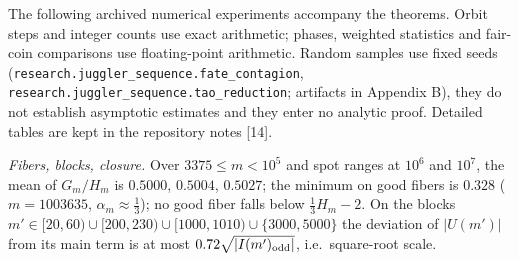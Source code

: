 \documentclass[11pt,a4paper]{article}
\begin{document}
The following archived numerical experiments accompany the theorems.
Orbit steps and integer counts use exact arithmetic; phases, weighted
statistics and fair-coin comparisons use floating-point arithmetic.
Random samples use fixed seeds
(\texttt{\nolinkurl{research.juggler_sequence.fate_contagion}},
\texttt{\nolinkurl{research.juggler_sequence.tao_reduction}}; artifacts
in Appendix B), they do not establish asymptotic estimates and they
enter no analytic proof. Detailed tables are kept in the repository
notes {[}14{]}.

\emph{Fibers, blocks, closure.} Over \(3375\le m<10^5\) and spot ranges
at \(10^6\) and \(10^7\), the mean of \(G_m/H_m\) is \(0.5000\),
\(0.5004\), \(0.5027\); the minimum on good fibers is \(0.328\)
(\(m=1003635\), \(\alpha_m\approx\tfrac13\)); no good fiber falls below
\(\tfrac13H_m-2\). On the blocks
\(m'\in[20,60)\cup[200,230)\cup[1000,1010)\cup\{3000,5000\}\) the
deviation of \(|U(m')|\) from its main term is at most
\(0.72\sqrt{|I(m')_{\rm odd}|}\), i.e.~square-root scale.
\end{document}
